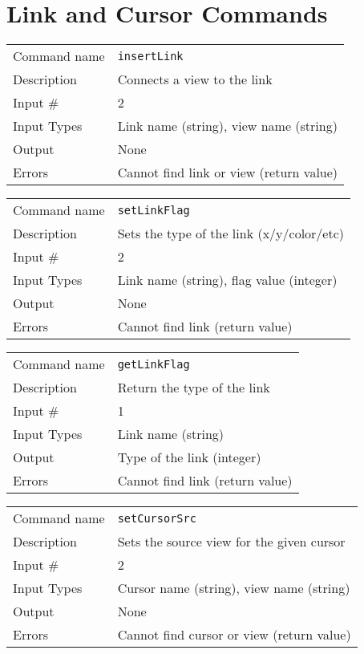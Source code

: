 \section{Link and Cursor Commands}

\noindent
\begin{tabular}{l|p{5in}}
\hline
Command name & {\tt insertLink} \\
Description  & Connects a view to the link \\
Input \#     & 2 \\
Input Types  & Link name (string), view name (string) \\
Output       & None \\
Errors       & Cannot find link or view (return value) \\
\hline
\end{tabular}

\bigskip

\noindent
\begin{tabular}{l|p{5in}}
\hline
Command name & {\tt setLinkFlag} \\
Description  & Sets the type of the link (x/y/color/etc) \\
Input \#     & 2 \\
Input Types  & Link name (string), flag value (integer) \\
Output       & None \\
Errors       & Cannot find link (return value) \\
\hline
\end{tabular}

\bigskip

\noindent
\begin{tabular}{l|p{5in}}
\hline
Command name & {\tt getLinkFlag} \\
Description  & Return the type of the link \\
Input \#     & 1 \\
Input Types  & Link name (string) \\
Output       & Type of the link (integer) \\
Errors       & Cannot find link (return value) \\
\hline
\end{tabular}

\bigskip

\noindent
\begin{tabular}{l|p{5in}}
\hline
Command name & {\tt setCursorSrc} \\
Description  & Sets the source view for the given cursor \\
Input \#     & 2 \\
Input Types  & Cursor name (string), view name (string) \\
Output       & None \\
Errors       & Cannot find cursor or view (return value) \\
\hline
\end{tabular}

